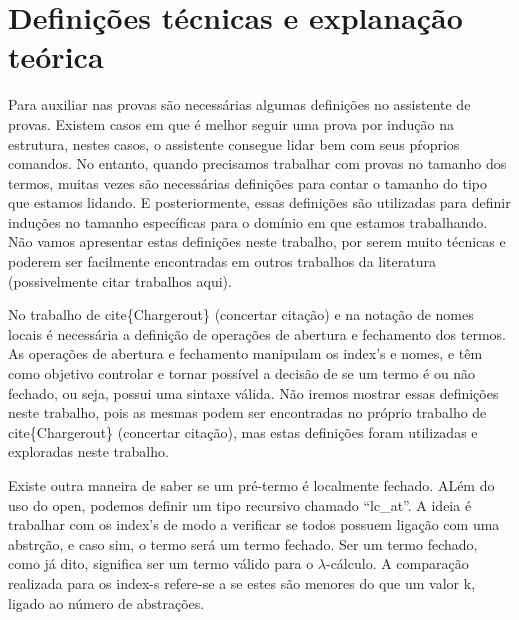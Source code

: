\section{Definições técnicas e explanação teórica}



 Para auxiliar nas provas são necessárias algumas definições no assistente de provas. Existem casos em que é melhor
seguir uma prova por indução na estrutura, nestes casos, o assistente consegue lidar bem com seus pŕoprios comandos. No entanto,
quando precisamos trabalhar com provas no tamanho dos termos, muitas vezes são necessárias definições para contar o tamanho do
tipo que estamos lidando. E posteriormente, essas definições são utilizadas para definir induções no tamanho específicas para o 
domínio em que estamos trabalhando. Não vamos apresentar estas definições neste trabalho, por serem muito técnicas e poderem
ser facilmente encontradas em outros trabalhos da literatura (possivelmente citar trabalhos aqui). 

 No trabalho de cite\{Chargerout\} (concertar citação) e na notação de nomes locais é necessária a definição de operações de
abertura e fechamento dos termos. As operações de abertura e fechamento manipulam os index's e nomes, e têm como objetivo controlar
e tornar possível a decisão de se um termo é ou não fechado, ou seja, possui uma sintaxe válida. Não iremos mostrar essas definições
neste trabalho, pois as mesmas podem ser encontradas no próprio trabalho de cite\{Chargerout\} (concertar citação), mas estas definições
foram utilizadas e exploradas neste trabalho. \begin{coqdoccode}
\coqdocemptyline
\coqdocemptyline
\end{coqdoccode}
Existe outra maneira de saber se um pré-termo é localmente fechado. ALém do uso do open, 
podemos definir um tipo recursivo chamado ``lc\_at''. A ideia é trabalhar com os index's de modo
a verificar se todos possuem ligação com uma abstrção, e caso sim, o termo será um termo fechado.
Ser um termo fechado, como já dito, significa ser um termo válido para o $\lambda$-cálculo. A comparação
realizada para os index-s refere-se a se estes são menores do que um valor k, ligado ao número de 
abstrações. 

